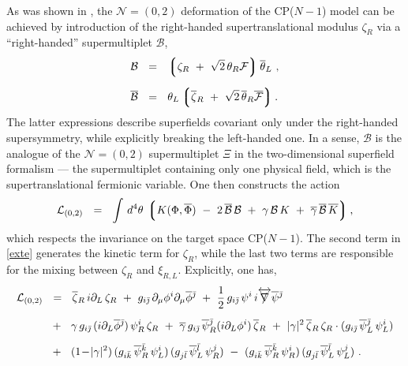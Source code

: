 \documentclass[12pt]{article}
\def\beq{\begin{equation}}
\def\eeq{\end{equation}}
\newcommand{\ntwoo}{${\mathcal N}= \left(0,2\right) $ }
\newcommand{\p}{\partial}
\newcommand{\ov}{\overline}
\newcommand{\mc}[1]{\mathcal{#1}}
\newcommand{\lgr}{\left\lgroup}
\newcommand{\rgr}{\right\rgroup}
\def\slashed#1{\setbox0=\hbox{$#1$}             %
   \dimen0=\wd0                                 %
   \setbox1=\hbox{/} \dimen1=\wd1               %
   \ifdim\dimen0>\dimen1                        %
      \rlap{\hbox to \dimen0{\hfil/\hfil}}      %
      #1                                        %
   \else                                        %
      \rlap{\hbox to \dimen1{\hfil$#1$\hfil}}   %
      /                                         %
   \fi}                                        %
\newcommand{\bzr}{\ov{\zeta}{}_R}
\newcommand{\zr}{\zeta_R}
\begin{document}
	As was shown in \cite{SYhet},  the \ntwoo deformation of the CP($N-1$) model can be achieved by
	introduction of the right-handed supertranslational modulus $ \zeta_R $ via a ``right-handed'' 
	supermultiplet $ \mc{B} $,
\begin{align*}
%
	\mc{B} & ~~=~~ \lgr \zr ~+~ \sqrt{2}\,\theta_R\mc{F} \rgr \ov{\theta}{}_L~, \\[2mm]
%
	\ov{\mc{B}} & ~~=~~ \theta_L \lgr \bzr ~+~ \sqrt{2}\, \ov{\theta}{}_R \ov{\mc{F}} \rgr.
\end{align*}
	The latter expressions describe superfields covariant only under the right-handed supersymmetry, 
	while explicitly breaking the left-handed one.
	In a sense, $ \mc{B} $ is the analogue of the \ntwoo supermultiplet $\Xi$ in the two-dimensional 
	superfield formalism \cite{Edalati} ---
	the supermultiplet containing only one physical field, which is the supertranslational
	fermionic variable.
	One then constructs the action 
\beq
\label{exte}
	\mc{L}_{(0,2)} ~~=~~ \int\, d^4\theta\, \lgr K(\Phi,\ov{\Phi}) 
		~-~ 2\, \ov{\mc{B}}\,\mc{B}  ~+~  \gamma\,\mc{B}\,K  ~+~ \ov{\gamma}\,\ov{\mc{B}}\,\ov{K} \rgr,
\eeq
	which respects the invariance on the target space CP($N-1$).
	The second term in \eqref{exte} generates the kinetic term for $ \zr $, while the last two terms 
	are responsible for the mixing between $ \zr $ and $ \xi_{R,L} $.
	Explicitly, one has,
\begin{align}
%
\notag
	\mc{L}_{(0,2)} & ~~=~~  \bzr\, i\p_L\, \zr 
			~+~ g_{i\bj}\,\p_\mu \phi^i \p_\mu\ov{\phi}{}^\bj
			~+~ \frac{1}{2}\, g_{i\bj}\, \psi^i\, i\overleftrightarrow{\slashed{\nabla}} \ov{\psi}{}^\bj 
	\\[2mm]
%
\label{cpn-1g}
			& 
			~~+~~ \gamma\, g_{i\bj}\, (i \p_L \ov{\phi}{}^\bj)\, \psi_R^i\, \zr
			~+~ \ov{\gamma}\, g_{i\bj}\, \ov{\psi}{}_R^\bj (i \p_L \phi^i)\, \bzr
			~+~ |\gamma|^2\, \bzr\,\zr \cdot ( g_{i\bj}\, \ov{\psi}{}_L^\bj\, \psi_L^i )
	\\[2mm]
%
\notag
			& 
			~~+~~ (1 \!-\! |\gamma|^2)\, (g_{i\bk}\, \ov{\psi}{}_R^\bk\, \psi_L^i)\,
						     (g_{j\bl}\, \ov{\psi}{}_L^\bl\, \psi_R^j)
			~-~ (g_{i\bk}\, \ov{\psi}{}_R^\bk\, \psi_R^i)\, (g_{j\bl}\, \ov{\psi}{}_L^\bl\, \psi_L^j)~.
\end{align}
	
\end{document}
